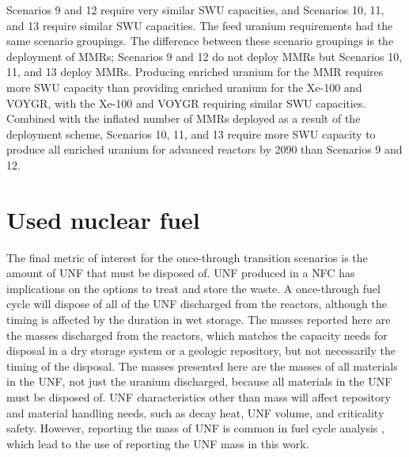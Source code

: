 Scenarios 9 and 12 require very similar \gls{SWU} capacities, and 
Scenarios 10, 11, and 13 require similar \gls{SWU} capacities. 
The feed uranium requirements had the same scenario groupings. 
The difference between these scenario groupings is the deployment 
of \glspl{MMR}; Scenarios 9 and 12 do not deploy \glspl{MMR} but 
Scenarios 10, 11, and 13 deploy \glspl{MMR}. Producing enriched uranium 
for the \gls{MMR} requires more \gls{SWU} capacity than providing 
enriched uranium for the Xe-100 and VOYGR, with the Xe-100 and VOYGR 
requiring similar \gls{SWU} capacities. Combined with the inflated 
number of \glspl{MMR} deployed as a result of the deployment scheme, 
Scenarios 10, 11, and 13 require more \gls{SWU} capacity to produce 
all enriched uranium for advanced reactors by 2090 than Scenarios 9 and 12. 

\section{Used nuclear fuel}
The final metric of interest for the once-through transition scenarios is 
the amount of \gls{UNF} that must be disposed of.
\gls{UNF} produced in a \gls{NFC} has implications on the options 
to treat and store the waste. A once-through fuel cycle will dispose of 
all of the \gls{UNF} discharged from the reactors, although 
the timing is affected by the duration in wet storage. The masses 
reported here are the masses discharged from the reactors, which 
matches the capacity needs for disposal in a dry storage system or a 
geologic repository, but not necessarily the timing of the disposal.
The masses 
presented here are the masses of all materials in the \gls{UNF}, not just 
the uranium discharged, because all materials in the \gls{UNF} must be 
disposed of. \gls{UNF} characteristics other than mass will affect repository 
and material handling needs, such as decay heat, \gls{UNF} volume, and 
criticality safety. However, reporting the mass of \gls{UNF} is common in 
fuel cycle analysis \cite{sunny_transition_2015,feng_standardized_2016,bae_standardized_2019},
which lead to the use of reporting the \gls{UNF} mass in this work. 

